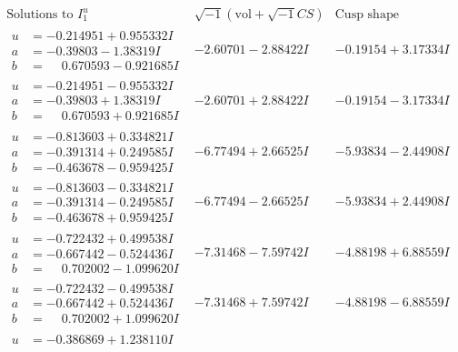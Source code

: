 \documentclass[1p]{elsarticle_modified}
\theoremstyle{definition}
\newcommand{\I}{\sqrt{-1}}
\begin{document}
$$\begin{array}{c|c|c}  
\text{Solutions to }I^u_{1}& \I (\text{vol} + \sqrt{-1}CS) & \text{Cusp shape}\\
 \hline 
\begin{aligned}
u &= -0.214951 + 0.955332 I \\
a &= -0.39803 - 1.38319 I \\
b &= \phantom{-}0.670593 - 0.921685 I\end{aligned}
 & -2.60701 - 2.88422 I & -0.19154 + 3.17334 I \\ \hline\begin{aligned}
u &= -0.214951 - 0.955332 I \\
a &= -0.39803 + 1.38319 I \\
b &= \phantom{-}0.670593 + 0.921685 I\end{aligned}
 & -2.60701 + 2.88422 I & -0.19154 - 3.17334 I \\ \hline\begin{aligned}
u &= -0.813603 + 0.334821 I \\
a &= -0.391314 + 0.249585 I \\
b &= -0.463678 - 0.959425 I\end{aligned}
 & -6.77494 + 2.66525 I & -5.93834 - 2.44908 I \\ \hline\begin{aligned}
u &= -0.813603 - 0.334821 I \\
a &= -0.391314 - 0.249585 I \\
b &= -0.463678 + 0.959425 I\end{aligned}
 & -6.77494 - 2.66525 I & -5.93834 + 2.44908 I \\ \hline\begin{aligned}
u &= -0.722432 + 0.499538 I \\
a &= -0.667442 - 0.524436 I \\
b &= \phantom{-}0.702002 - 1.099620 I\end{aligned}
 & -7.31468 - 7.59742 I & -4.88198 + 6.88559 I \\ \hline\begin{aligned}
u &= -0.722432 - 0.499538 I \\
a &= -0.667442 + 0.524436 I \\
b &= \phantom{-}0.702002 + 1.099620 I\end{aligned}
 & -7.31468 + 7.59742 I & -4.88198 - 6.88559 I \\ \hline\begin{aligned}
u &= -0.386869 + 1.238110 I \\

\end{aligned}
\end{array}$$
\end{document}
